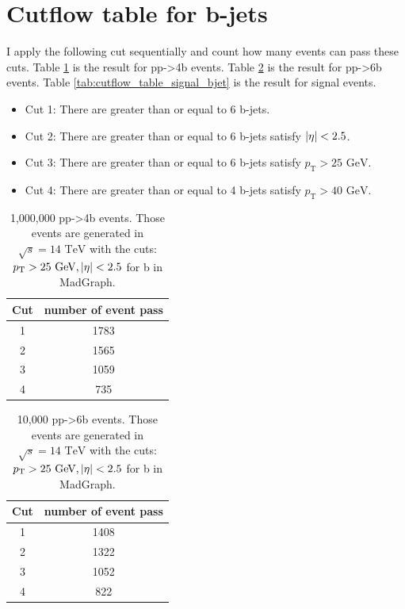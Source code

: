 \documentclass[12pt]{article}
\begin{document}
\section{Cutflow table for b-jets}%
\label{sec:cutflow_table_for_b_jets}
	I apply the following cut sequentially and count how many events can pass these cuts. Table \ref{tab:cutflow_table_pp4b_bjet} is the result for pp->4b events. Table \ref{tab:cutflow_table_pp6b_bjet} is the result for pp->6b events. Table \ref{tab:cutflow_table_signal_bjet} is the result for signal events.

	\begin{itemize}
		\item Cut 1: There are greater than or equal to 6 b-jets.
		\item Cut 2: There are greater than or equal to 6 b-jets satisfy $\abs{\eta}<2.5$.
		\item Cut 3: There are greater than or equal to 6 b-jets satisfy $p_\text{T}>\text{25 GeV}$.
		\item Cut 4: There are greater than or equal to 4 b-jets satisfy $p_\text{T}>\text{40 GeV}$.
	\end{itemize}

	\begin{table}[htpb]
		\centering
		\caption{1,000,000 pp->4b events. Those events are generated in $\sqrt{s} = 14 \text{ TeV}$ with the cuts: $p_\text{T} >\text{25 GeV}, \abs{\eta}<2.5$ for b in MadGraph.
}
		\label{tab:cutflow_table_pp4b_bjet}
		\begin{tabular}{cc}
			Cut & number of event pass \\
			\hline
			1 & 1783 \\
			2 & 1565 \\
			3 & 1059 \\
			4 & 735 
		\end{tabular}	
	\end{table}

	\begin{table}[htpb]
		\centering
		\caption{10,000 pp->6b events. Those events are generated in $\sqrt{s} = 14 \text{ TeV}$ with the cuts: $p_\text{T} >\text{25 GeV}, \abs{\eta}<2.5$ for b in MadGraph.
}
		\label{tab:cutflow_table_pp6b_bjet}
		\begin{tabular}{cc}
			Cut & number of event pass \\
			\hline
			1 & 1408 \\
			2 & 1322 \\
			3 & 1052 \\
			4 & 822 
		\end{tabular}	
	\end{table}
\end{document}
